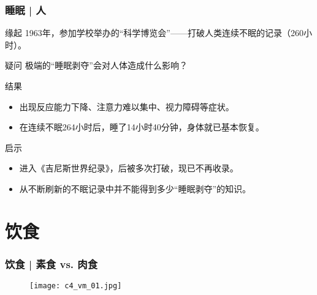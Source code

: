 \begin{frame}
  \frametitle{睡眠 | 人}
  \begin{block}{缘起}
    1963年，参加学校举办的“科学博览会”——打破人类连续不眠的记录（260小时）。
  \end{block}
  \pause
  \begin{block}{疑问}
    极端的“睡眠剥夺”会对人体造成什么影响？
  \end{block}
  \pause
  \begin{block}{结果}
    \begin{itemize}
      \item 出现反应能力下降、注意力难以集中、视力障碍等症状。
      \item 在连续不眠264小时后，睡了14小时40分钟，身体就已基本恢复。
    \end{itemize}
  \end{block}
  \pause
  \begin{block}{启示}
    \begin{itemize}
      \item 进入《吉尼斯世界纪录》，后被多次打破，现已不再收录。
      \item 从不断刷新的不眠记录中并不能得到多少“睡眠剥夺”的知识。
    \end{itemize}
  \end{block}
\end{frame}

\section{饮食}
\begin{frame}
  \frametitle{饮食 | 素食 vs. 肉食}
  \begin{figure}
    \centering
    \texttt{[image: c4\_vm\_01.jpg]}
  \end{figure}
\end{frame}

